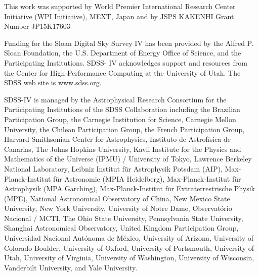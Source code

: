\documentclass[a4paper,fleqn,usenatbib]{mnras}
\begin{document}
\noindent This work was supported by World Premier International Research Center Initiative (WPI Initiative), MEXT, Japan and by JSPS KAKENHI Grant Number JP15K17603

\noindent Funding for the Sloan Digital Sky Survey IV has been provided by the Alfred P. Sloan Foundation, the U.S. Department of Energy Office of Science, and the Participating Institutions. SDSS- IV acknowledges support and resources from the Center for High-Performance Computing at the University of Utah. The SDSS web site is www.sdss.org.

\noindent SDSS-IV is managed by the Astrophysical Research Consortium for the Participating Institutions of the SDSS Collaboration including the Brazilian Participation Group, the Carnegie Institution for Science, Carnegie Mellon University, the Chilean Participation Group, the French Participation Group, Harvard-Smithsonian Center for Astrophysics, Instituto de Astrof\'{i}sica de Canarias, The Johns Hopkins University, Kavli Institute for the Physics and Mathematics of the Universe (IPMU) / University of Tokyo, Lawrence Berkeley National Laboratory, Leibniz Institut f\"{u}r  Astrophysik Potsdam (AIP), Max-Planck-Institut f\"{u}r  Astronomie (MPIA Heidelberg), Max-Planck-Institut f\"{u}r Astrophysik (MPA Garching), Max-Planck-Institut f\"{u}r  Extraterrestrische Physik (MPE), National Astronomical Observatory of China, New Mexico State University, New York University, University of Notre Dame, Observat\'{o}rio Nacional / MCTI, The Ohio State University, Pennsylvania State University, Shanghai Astronomical Observatory, United Kingdom Participation Group, Universidad Nacional Aut\'{o}noma de M\'{e}xico, University of Arizona, University of Colorado Boulder, University of Oxford, University of Portsmouth, University of Utah, University of Virginia, University of Washington, University of Wisconsin, Vanderbilt University, and Yale University.





%
\end{document}
